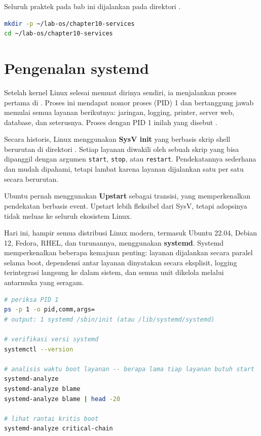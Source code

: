 \begin{notebox}
Seluruh praktek pada bab ini dijalankan pada direktori .
\begin{lstlisting}[language=bash]
mkdir -p ~/lab-os/chapter10-services
cd ~/lab-os/chapter10-services
\end{lstlisting}
\end{notebox}

\section{Pengenalan systemd}
\label{sec:init-system}

Setelah kernel Linux selesai memuat dirinya sendiri, ia menjalankan proses pertama di . Proses ini mendapat nomor proses (PID) 1 dan bertanggung jawab memulai semua layanan berikutnya: jaringan, logging, printer, server web, database, dan seterusnya. Proses dengan PID 1 inilah yang disebut .

Secara historis, Linux menggunakan \textbf{SysV init} yang berbasis skrip shell berurutan di direktori . Setiap layanan diwakili oleh sebuah skrip yang bisa dipanggil dengan argumen \texttt{start}, \texttt{stop}, atau \texttt{restart}. Pendekatannya sederhana dan mudah dipahami, tetapi lambat karena layanan dijalankan satu per satu secara berurutan.

Ubuntu pernah menggunakan \textbf{Upstart} sebagai transisi, yang memperkenalkan pendekatan berbasis event. Upstart lebih fleksibel dari SysV, tetapi adopsinya tidak meluas ke seluruh ekosistem Linux.

Hari ini, hampir semua distribusi Linux modern, termasuk Ubuntu 22.04, Debian 12, Fedora, RHEL, dan turunannya, menggunakan \textbf{systemd}. Systemd memperkenalkan beberapa kemajuan penting: layanan dijalankan secara paralel selama boot, dependensi antar layanan dinyatakan secara eksplisit, logging terintegrasi langsung ke dalam sistem, dan semua unit dikelola melalui antarmuka yang seragam.

\begin{lstlisting}[language=bash, caption={Verifikasi init system dan analisis waktu boot}]
# periksa PID 1
ps -p 1 -o pid,comm,args=
# output: 1 systemd /sbin/init (atau /lib/systemd/systemd)

# verifikasi versi systemd
systemctl --version

# analisis waktu boot layanan -- berapa lama tiap layanan butuh start
systemd-analyze
systemd-analyze blame
systemd-analyze blame | head -20

# lihat rantai kritis boot
systemd-analyze critical-chain
\end{lstlisting}

